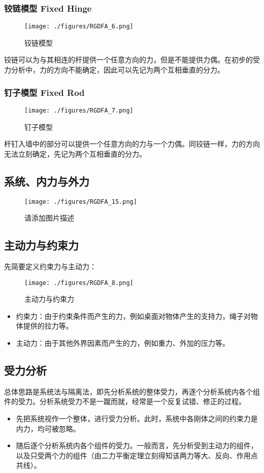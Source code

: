 \subsubsection{铰链模型 Fixed Hinge}
\begin{figure}[ht]
\centering
\texttt{[image: ./figures/RGDFA\_6.png]}
\caption{铰链模型} \label{RGDFA_fig6}
\end{figure}
铰链可以为与其相连的杆提供一个任意方向的力，但是不能提供力偶。在初步的受力分析中，力的方向不能确定，因此可以先记为两个互相垂直的分力。
\subsubsection{钉子模型 Fixed Rod}
\begin{figure}[ht]
\centering
\texttt{[image: ./figures/RGDFA\_7.png]}
\caption{钉子模型} \label{RGDFA_fig7}
\end{figure}
杆钉入墙中的部分可以提供一个任意方向的力与一个力偶。同铰链一样，力的方向无法立刻确定，先记为两个互相垂直的分力。

\subsection{系统、内力与外力}
\begin{figure}[ht]
\centering
\texttt{[image: ./figures/RGDFA\_15.png]}
\caption{请添加图片描述} \label{RGDFA_fig15}
\end{figure}

\subsection{主动力与约束力}
先简要定义约束力与主动力：
\begin{figure}[ht]
\centering
\texttt{[image: ./figures/RGDFA\_8.png]}
\caption{主动力与约束力} \label{RGDFA_fig8}
\end{figure}
\begin{itemize}
\item 约束力：由于约束条件而产生的力，例如桌面对物体产生的支持力，绳子对物体提供的拉力等。
\item 主动力：由于其他外界因素而产生的力，例如重力、外加的压力等。
\end{itemize}

\subsection{受力分析}
总体思路是系统法与隔离法，即先分析系统的整体受力，再逐个分析系统内各个组件的受力。分析系统受力不是一蹴而就，经常是一个反复试错、修正的过程。
\begin{itemize}
\item 先把系统视作一个整体，进行受力分析。此时，系统中各刚体之间的约束力是内力，均可被忽略。
\item 随后逐个分析系统内各个组件的受力。一般而言，先分析受到主动力的组件，以及只受两个力的组件（由二力平衡定理立刻得知该两力等大、反向、作用点共线）。
\end{itemize}

